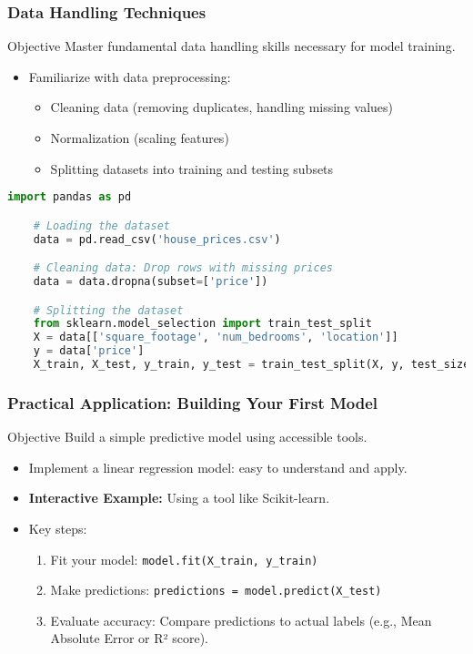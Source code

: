 \documentclass[aspectratio=169]{beamer}
\begin{document}
\begin{frame}[fragile]
    \frametitle{Data Handling Techniques}
    \begin{block}{Objective}
        Master fundamental data handling skills necessary for model training.
    \end{block}
    \begin{itemize}
        \item Familiarize with data preprocessing:
        \begin{itemize}
            \item Cleaning data (removing duplicates, handling missing values)
            \item Normalization (scaling features)
            \item Splitting datasets into training and testing subsets
        \end{itemize}
    \end{itemize}
    \begin{lstlisting}[language=Python, caption={Data Handling Code Snippet}]
    import pandas as pd

    # Loading the dataset
    data = pd.read_csv('house_prices.csv')

    # Cleaning data: Drop rows with missing prices
    data = data.dropna(subset=['price'])

    # Splitting the dataset
    from sklearn.model_selection import train_test_split
    X = data[['square_footage', 'num_bedrooms', 'location']]
    y = data['price']
    X_train, X_test, y_train, y_test = train_test_split(X, y, test_size=0.2, random_state=42)
    \end{lstlisting}
\end{frame}

\begin{frame}[fragile]
    \frametitle{Practical Application: Building Your First Model}
    \begin{block}{Objective}
        Build a simple predictive model using accessible tools.
    \end{block}
    \begin{itemize}
        \item Implement a linear regression model: easy to understand and apply.
        \item \textbf{Interactive Example:} Using a tool like Scikit-learn.
        \item Key steps:
        \begin{enumerate}
            \item Fit your model: \texttt{model.fit(X\_train, y\_train)}
            \item Make predictions: \texttt{predictions = model.predict(X\_test)}
            \item Evaluate accuracy: Compare predictions to actual labels (e.g., Mean Absolute Error or R² score).
        \end{enumerate}
    \end{itemize}
\end{frame}
\end{document}
